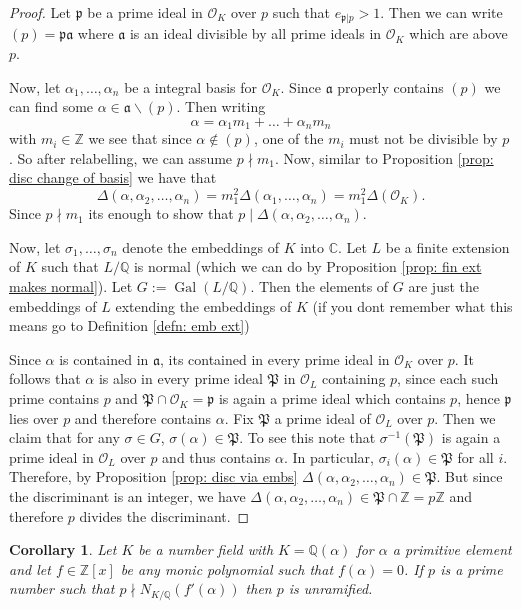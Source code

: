 \documentclass[11pt,a4paper]{report}
\theoremstyle{plain}
\newtheorem{cor}[subsection]{Corollary}
\theoremstyle{definition}
\theoremstyle{definition}
\newcommand{\ZZ}{\mathbb{Z}}
\def\CC{\mathbb{C}}
\def\QQ{\mathbb{Q}}
\def \gothP{\mathfrak{P}}
\def\gothp{\mathfrak{p}}
\def \a{\alpha}
\def \s {\sigma}
\def \OO {\mathcal{O}}
\def \s {\sigma}
\def\gotha{\mathfrak{a}}
\DeclareMathOperator{\Gal}{Gal}
\begin{document}
\begin{proof}
	Let $\gothp$ be a prime ideal in $\OO_K$ over $p$ such that $e_{\gothp|p}>1$. Then we can write $(p)=\gothp \gotha$ where $\gotha$ is an ideal divisible by all prime ideals in $\OO_K$ which are above $p$. 
	
	Now, let $\a_1,\dots,\a_n$ be  a integral basis for $\OO_K$. Since $\gotha$ properly contains $(p)$ we can find some $\a \in \gotha \backslash (p)$. Then writing \[\a=\a_1m_1+\dots+\a_nm_n\] with $m_i \in \ZZ$ we see that since $\a \not \in (p)$, one of the $m_i$ must not be divisible by $p$. So after relabelling, we can assume $p \nmid m_1$. Now, similar to Proposition \ref{prop: disc change of basis} we have that \[\Delta(\a,\a_2,\dots,\a_n)=m_1^2 \Delta(\a_1,\dots,\a_n)=m_1^2\Delta(\OO_K).\] Since $p \nmid m_1$ its enough to show that $p \mid \Delta(\a,\a_2,\dots,\a_n)$.
	
	Now, let $\s_1,\dots,\s_n$ denote the embeddings of $K$ into $\CC$. Let $L$ be a finite extension of $K$ such that $L/\QQ$ is normal (which we can do by Proposition \ref{prop: fin ext makes normal}). Let $G:=\Gal(L/\QQ)$. Then the elements of $G$ are just the embeddings of $L$ extending the embeddings of $K$ (if you dont remember what this means go to Definition \ref{defn: emb ext})
	
	Since $\a$ is contained in $\gotha$, its contained in every prime ideal in $\OO_K$ over $p$. It follows that $\a$ is also in every prime ideal $\gothP$ in $\OO_L$ containing $p$, since each such prime contains $p$ and $\gothP \cap \OO_K=\gothp$ is again a prime ideal which contains $p$, hence $\gothp$ lies over $p$ and therefore contains $\a$. Fix $\gothP$ a prime ideal of $\OO_L$ over $p$. Then we claim that for any $\s \in G$, $\s(\a) \in \gothP$. To see this note that $\s^{-1}(\gothP)$ is again a prime ideal in $\OO_L$ over $p$ and thus contains $\a$. In particular, $\s_i(\a) \in \gothP$ for all $i$. Therefore, by Proposition \ref{prop: disc via embs} $\Delta(\a,\a_2,\dots,\a_n) \in \gothP$. But since the discriminant is an integer, we have $\Delta(\a,\a_2,\dots,\a_n) \in \gothP \cap \ZZ=p\ZZ$ and therefore $p$ divides the discriminant.
	
\end{proof}

\begin{cor}\label{cor: p unram if norm of blah}
	Let $K$ be a number field with $K=\QQ(\a)$ for $\a$ a primitive element and let $f \in \ZZ[x]$ be any monic polynomial such that $f(\a)=0$. If $p$ is a prime number such that $p \nmid N_{K/\QQ}(f'(\a))$ then $p$ is unramified.
\end{cor}
\end{document}
